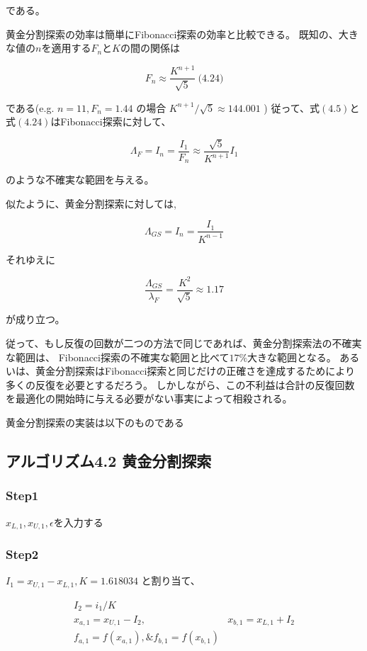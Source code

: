 である。

黄金分割探索の効率は簡単にFibonacci探索の効率と比較できる。
既知の、大きな値の$n$を適用する$F_n$と$K$の間の関係は

$$F_n \approx
\frac{K^{n+1}}{\sqrt{5}}
\ \text{(4.24)}$$

である(e.g. $n=11, F_n =1.44$ の場合 $K^{n+1} /
\sqrt{5} \approx 144.001$ )
従って、式$(4.5)$と式$(4.24)$はFibonacci探索に対して、

$$ \Lambda_F = I_n =
\frac{I_1}{F_n} \approx
\frac{\sqrt{5}}{K^{n+1}} I_1
$$

のような不確実な範囲を与える。

似たように、黄金分割探索に対しては,

$$\Lambda_{GS} = I_n =
\frac{I_1}{K^{n-1}}$$

それゆえに

$$
\frac{\Lambda_{GS}}{\lambda_F}
= \frac{K^2}{\sqrt{5}}
\approx 1.17 $$

が成り立つ。

従って、もし反復の回数が二つの方法で同じであれば、黄金分割探索法の不確実な範囲は、
Fibonacci探索の不確実な範囲と比べて$17\%$大きな範囲となる。
あるいは、黄金分割探索はFibonacci探索と同じだけの正確さを達成するためにより多くの反復を必要とするだろう。
しかしながら、この不利益は合計の反復回数を最適化の開始時に与える必要がない事実によって相殺される。

黄金分割探索の実装は以下のものである

\subsection*{アルゴリズム4.2 黄金分割探索}\label{-4-2-}

\subsubsection*{Step1}\label{step1}

$x_{L,1}, x_{U,1}, \epsilon$を入力する

\subsubsection*{Step2}\label{step2}

$I_1 = x_{U,1} - x_{L,1}, K = 1.618034$ と割り当て、

$$ \begin{array}{cc} I_2 = i_1 / K
\\ x_{a,1} = x_{U,1} - I_2, &
x_{b,1} = x_{L,1} + I_2 \\
f_{a,1} = f(x_{a,1}), \& f_{b,1} = f(x_{b,1})
\end{array} $$

